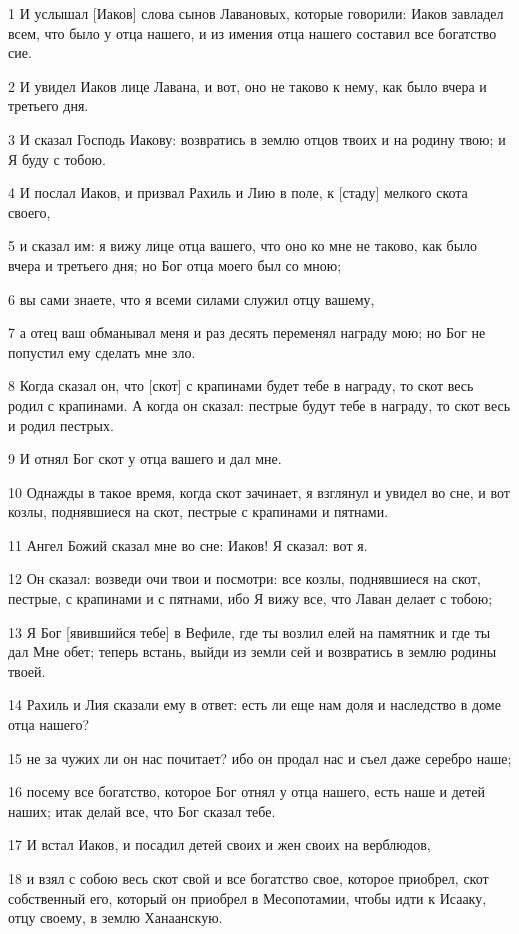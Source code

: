 \par 1 И услышал [Иаков] слова сынов Лавановых, которые говорили: Иаков завладел всем, что было у отца нашего, и из имения отца нашего составил все богатство сие.
\par 2 И увидел Иаков лице Лавана, и вот, оно не таково к нему, как было вчера и третьего дня.
\par 3 И сказал Господь Иакову: возвратись в землю отцов твоих и на родину твою; и Я буду с тобою.
\par 4 И послал Иаков, и призвал Рахиль и Лию в поле, к [стаду] мелкого скота своего,
\par 5 и сказал им: я вижу лице отца вашего, что оно ко мне не таково, как было вчера и третьего дня; но Бог отца моего был со мною;
\par 6 вы сами знаете, что я всеми силами служил отцу вашему,
\par 7 а отец ваш обманывал меня и раз десять переменял награду мою; но Бог не попустил ему сделать мне зло.
\par 8 Когда сказал он, что [скот] с крапинами будет тебе в награду, то скот весь родил с крапинами. А когда он сказал: пестрые будут тебе в награду, то скот весь и родил пестрых.
\par 9 И отнял Бог скот у отца вашего и дал мне.
\par 10 Однажды в такое время, когда скот зачинает, я взглянул и увидел во сне, и вот козлы, поднявшиеся на скот, пестрые с крапинами и пятнами.
\par 11 Ангел Божий сказал мне во сне: Иаков! Я сказал: вот я.
\par 12 Он сказал: возведи очи твои и посмотри: все козлы, поднявшиеся на скот, пестрые, с крапинами и с пятнами, ибо Я вижу все, что Лаван делает с тобою;
\par 13 Я Бог [явившийся тебе] в Вефиле, где ты возлил елей на памятник и где ты дал Мне обет; теперь встань, выйди из земли сей и возвратись в землю родины твоей.
\par 14 Рахиль и Лия сказали ему в ответ: есть ли еще нам доля и наследство в доме отца нашего?
\par 15 не за чужих ли он нас почитает? ибо он продал нас и съел даже серебро наше;
\par 16 посему все богатство, которое Бог отнял у отца нашего, есть наше и детей наших; итак делай все, что Бог сказал тебе.
\par 17 И встал Иаков, и посадил детей своих и жен своих на верблюдов,
\par 18 и взял с собою весь скот свой и все богатство свое, которое приобрел, скот собственный его, который он приобрел в Месопотамии, чтобы идти к Исааку, отцу своему, в землю Ханаанскую.

